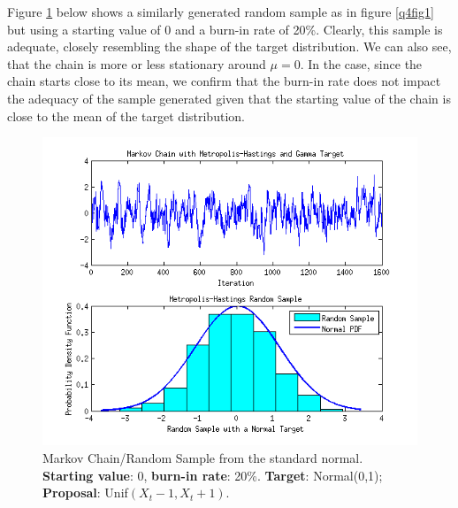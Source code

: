 \documentclass[12pt,a4paper]{article}
\begin{document}
Figure \ref{q4fig4} below shows a similarly generated random sample as in figure \ref{q4fig1} but using a starting value of 0 and a burn-in rate of 20\%. Clearly, this sample is  adequate, closely resembling the shape of the target distribution. We can also see, that the chain is more or less stationary around $\mu=0$. In the case, since the chain starts close to its mean, we confirm that the burn-in rate does not impact the adequacy of the sample generated given that the starting value of the chain is close to the mean of the target distribution.
\begin{figure}[ht!] 
\begin{center}
\includegraphics[scale=.95]{graph8.png}
\caption{Markov Chain/Random Sample from the standard normal. \textbf{Starting value}: 0, \textbf{burn-in rate}: 20\%. \textbf{Target}: Normal(0,1); \textbf{Proposal}: Unif$(X_t-1,X_t+1)$.}
\label{q4fig4}
\end{center}
\end{figure}
\FloatBarrier
\end{document}
